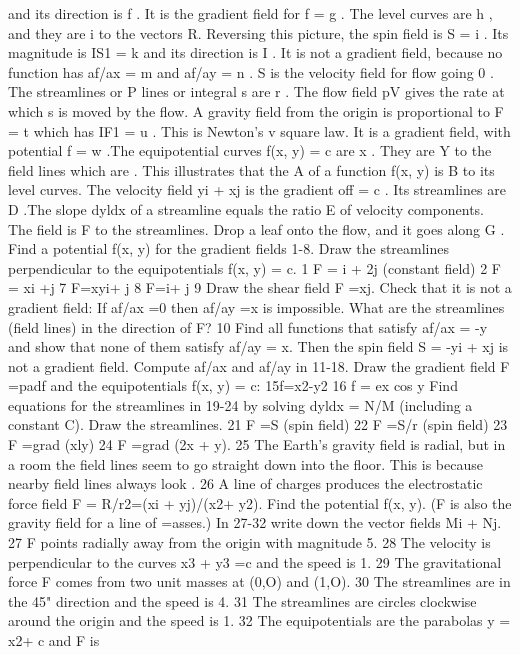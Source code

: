 {and its direction is f . It is the gradient field for f =
g . The level curves are h , and they are i to
the vectors R.
Reversing this picture, the spin field is S = i . Its magnitude
is IS1 = k and its direction is I . It is not a
gradient field, because no function has af/ax = m and
af/ay = n . S is the velocity field for flow going 0 . The streamlines or P lines or integral s are r . The flow field pV gives the rate at which s is moved
by the flow.
A gravity field from the origin is proportional to F = t
which has IF1 = u . This is Newton's v square law.
It is a gradient field, with potential f = w .The equipotential
curves f(x, y) = c are x . They are Y to the field
lines which are . This illustrates that the A of a
function f(x, y) is B to its level curves.
The velocity field yi + xj is the gradient off = c . Its
streamlines are D .The slope dyldx of a streamline equals
the ratio E of velocity components. The field is F to
the streamlines. Drop a leaf onto the flow, and it goes along
G .
Find a potential f(x, y) for the gradient fields 1-8. Draw the
streamlines perpendicular to the equipotentials f(x, y) = c.
1 F = i + 2j (constant field) 2 F = xi +j
7 F=xyi+ j 8 F=i+ j
9 Draw the shear field F =xj. Check that it is not a gradient
field: If af/ax =0 then af/ay =x is impossible. What are the
streamlines (field lines) in the direction of F?
10 Find all functions that satisfy af/ax = -y and show that
none of them satisfy af/ay = x. Then the spin field S =
-yi + xj is not a gradient field.
Compute af/ax and af/ay in 11-18. Draw the gradient field
F =padf and the equipotentials f(x, y) = c:
15f=x2-y2 16 f = ex cos y
Find equations for the streamlines in 19-24 by solving dyldx =
N/M (including a constant C). Draw the streamlines.
21 F =S (spin field) 22 F =S/r (spin field)
23 F =grad (xly) 24 F =grad (2x + y).
25 The Earth's gravity field is radial, but in a room the field
lines seem to go straight down into the floor. This is because
nearby field lines always look .
26 A line of charges produces the electrostatic force field F =
R/r2=(xi + yj)/(x2+ y2). Find the potential f(x, y). (F is also
the gravity field for a line of =asses.)
In 27-32 write down the vector fields Mi + Nj.
27 F points radially away from the origin with magnitude 5.
28 The velocity is perpendicular to the curves x3 + y3 =c and
the speed is 1.
29 The gravitational force F comes from two unit masses at
(0,O) and (1,O).
30 The streamlines are in the 45" direction and the speed is 4.
31 The streamlines are circles clockwise around the origin
and the speed is 1.
32 The equipotentials are the parabolas y = x2+ c and F is
}
